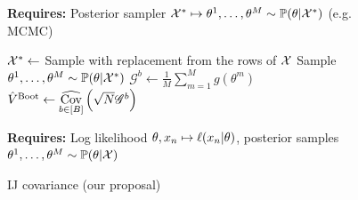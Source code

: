 \begin{figure}
    \begin{algorithm}[H]
        \caption{Bootstrap covariance}
        \textbf{Requires: } Posterior sampler ${\mathcal{X}}^* \mapsto \theta^1,\ldots,\theta^M \sim \mathbb{P}(\theta | {\mathcal{X}}^*)$
        (e.g. MCMC)
        \begin{algorithmic}
            \State ${\mathcal{X}}^* \gets$ Sample with replacement from the rows of ${\mathcal{X}}$
            \State Sample
                $\theta^1,\ldots,\theta^M \sim \mathbb{P}(\theta | {\mathcal{X}}^*)$
            \State $\mathscr{G}^b \gets
                \frac{1}{M} \sum_{m=1}^M g(\theta^m)$
        \EndFor
        \State \Return $\hat{V}^{\mathrm{Boot}} \gets \underset{b \in [B]}{\widehat{\mathrm{Cov}}}\left(\sqrt{N} \mathscr{G}^b\right)$
        \end{algorithmic}
    \end{algorithm}
    
    \begin{algorithm}[H]
        \caption{IJ covariance (our proposal)}
        \textbf{Requires: } Log likelihood $\theta, x_n \mapsto \ell(x_n \vert \theta)$,
        posterior samples $\theta^1,\ldots,\theta^M \sim \mathbb{P}(\theta | {\mathcal{X}})$
        

\end{algorithm}
\end{figure}
